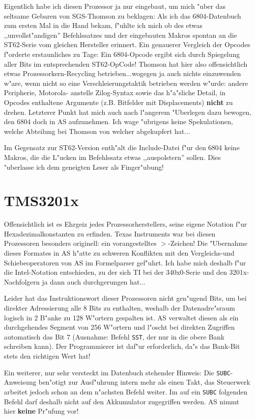\documentclass[12pt,a4paper,twoside]{report}
\newcommand{\bb}[1]{{\bf #1}}
\newcommand{\tty}[1]{{\tt #1}}
\begin{document}
Eigentlich habe ich diesen Prozessor ja nur eingebaut, um mich "uber
das seltsame Gebaren von SGS-Thomson zu beklagen: Als ich das
6804-Datenbuch zum ersten Mal in die Hand bekam, f"uhlte ich mich ob des
etwas ,,unvollst"andigen'' Befehlssatzes und der eingebauten Makros
spontan an die ST62-Serie vom gleichen Hersteller erinnert.  Ein
genauerer Vergleich der Opcodes f"orderte erstaunliches zu Tage:
Ein 6804-Opcode ergibt sich durch Spiegelung aller Bits im entsprechenden
ST62-OpCode!  Thomson hat hier also offensichtlich etwas
Prozessorkern-Recycling betrieben...wogegen ja auch nichts einzuwenden
w"are, wenn nicht so eine Verschleierungstaktik betrieben werden w"urde:
andere Peripherie, Motorola- anstelle Zilog-Syntax sowie das h"a"sliche
Detail, in Opcodes enthaltene Argumente (z.B. Bitfelder mit Displacements)
\bb{nicht} zu drehen. Letzterer Punkt hat mich auch nach l"angerem "Uberlegen
dazu bewogen, den 6804 doch in AS aufzunehmen.  Ich wage "ubrigens keine
Spekulationen, welche Abteilung bei Thomson von welcher abgekupfert hat...
\par
Im Gegensatz zur ST62-Version enth"alt die Include-Datei f"ur den
6804 keine Makros, die die L"ucken im Befehlssatz etwas ,,auspolstern''
sollen.  Dies "uberlasse ich dem geneigten Leser als Finger"ubung!


\section{TMS3201x}

Offensichtlich ist es Ehrgeiz jedes Prozessorherstellers, seine eigene
Notation f"ur Hexadezimalkonstanten zu erfinden.  Texas Instruments
war bei diesen Prozessoren besonders originell: ein vorangestelltes
$>$-Zeichen!  Die "Ubernahme dieses Formates in AS h"atte zu schweren
Konflikten mit den Vergleichs-und Schiebeoperatoren von AS im Formelparser
gef"uhrt.  Ich habe mich deshalb f"ur die Intel-Notation entschieden, zu
der sich TI bei der 340x0-Serie und den 3201x-Nachfolgern ja dann auch
durchgerungen hat...
\par
Leider hat das Instruktionswort dieser Prozessoren nicht gen"ugend Bits,
um bei direkter Adressierung alle 8 Bits zu enthalten, weshalb der
Datenadre"sraum logisch in 2 B"anke zu 128 W"ortern gespalten ist.  AS
verwaltet diesen als ein durchgehendes Segment von 256 W"ortern und
l"oscht bei direkten Zugriffen automatisch das Bit 7 (Ausnahme: Befehl
\tty{SST}, der nur in die obere Bank schreiben kann). Der Programmierer
ist daf"ur erforderlich, da"s das Bank-Bit stets den richtigen Wert hat!
\par
Ein weiterer, nur sehr versteckt im Datenbuch stehender Hinweis: Die
\tty{SUBC}-Anweisung ben"otigt zur Ausf"uhrung intern mehr als einen
Takt, das Steuerwerk arbeitet jedoch schon an dem n"achsten Befehl weiter.
Im auf ein \tty{SUBC} folgenden Befehl darf deshalb nicht auf den
Akkumulator zugegriffen werden.  AS nimmt hier \bb{keine} Pr"ufung vor!
\end{document}
